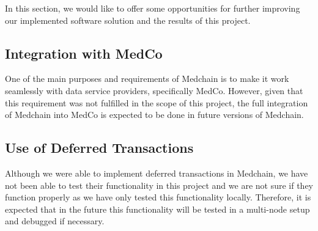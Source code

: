 In this section, we would like to offer some opportunities for further improving our implemented software solution and the results of this project. 

\subsection{Integration with MedCo}
One of the main purposes and requirements of Medchain is to make it work seamlessly with data service providers, specifically MedCo. However, given that this requirement was not fulfilled in the scope of this project, the full integration of Medchain into MedCo is expected to be done in future versions of Medchain.  

\subsection{Use of Deferred Transactions}
Although we were able to implement deferred transactions in Medchain, we have not been able to test their functionality in this project and we are not sure if they function properly as we have only tested this functionality locally. Therefore, it is expected that in the future this functionality will be tested in a multi-node setup and debugged if necessary. 

